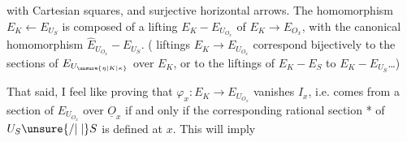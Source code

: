 with Cartesian squares, and surjective horizontal arrows. The homomorphism $E_K\longleftarrow E_{U_S}$ is composed of a lifting $E_K-E_{U_{O_x}}$ of $E_K\longrightarrow E_{O_x}$, with the canonical homomorphism $\widehat E_{U_{O_x}}-E_{U_S}$. (  liftings $E_K\longrightarrow E_{U_{O_x}}$ correspond bijectively to the sections of $E_{U_{\unsure{\eta|K|\kappa}}}$ over $E_K$, or to the liftings of $E_K-E_S$ to $E_K-E_{U_S}$\ldots)

That said, I feel like proving that $\varphi_x:E_K\longrightarrow E_{U_{O_x}}$ vanishes  $I_x$, i.e. comes from a section of $E_{U_{O_x}}$ over $\underline O_x$ if and only if the corresponding rational section * of $U_S\unsure{/|\mid}S$ is defined at $x$. This will imply
